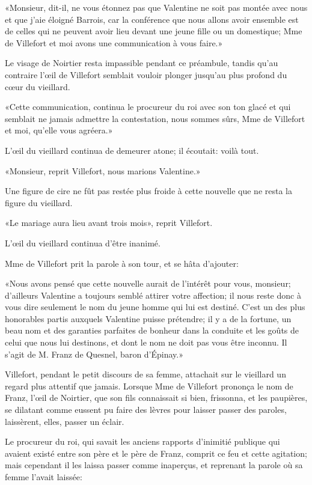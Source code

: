 «Monsieur, dit-il, ne vous étonnez pas que Valentine ne soit pas montée avec nous et que j'aie éloigné Barrois, car la conférence que nous allons avoir ensemble est de celles qui ne peuvent avoir lieu devant une jeune fille ou un domestique; Mme de Villefort et moi avons une communication à vous faire.» 

Le visage de Noirtier resta impassible pendant ce préambule, tandis qu'au contraire l'œil de Villefort semblait vouloir plonger jusqu'au plus profond du cœur du vieillard. 

«Cette communication, continua le procureur du roi avec son ton glacé et qui semblait ne jamais admettre la contestation, nous sommes sûrs, Mme de Villefort et moi, qu'elle vous agréera.» 

L'œil du vieillard continua de demeurer atone; il écoutait: voilà tout. 

«Monsieur, reprit Villefort, nous marions Valentine.» 

Une figure de cire ne fût pas restée plus froide à cette nouvelle que ne resta la figure du vieillard. 

«Le mariage aura lieu avant trois mois», reprit Villefort. 

L'œil du vieillard continua d'être inanimé. 

Mme de Villefort prit la parole à son tour, et se hâta d'ajouter: 

«Nous avons pensé que cette nouvelle aurait de l'intérêt pour vous, monsieur; d'ailleurs Valentine a toujours semblé attirer votre affection; il nous reste donc à vous dire seulement le nom du jeune homme qui lui est destiné. C'est un des plus honorables partis auxquels Valentine puisse prétendre; il y a de la fortune, un beau nom et des garanties parfaites de bonheur dans la conduite et les goûts de celui que nous lui destinons, et dont le nom ne doit pas vous être inconnu. Il s'agit de M. Franz de Quesnel, baron d'Épinay.» 

Villefort, pendant le petit discours de sa femme, attachait sur le vieillard un regard plus attentif que jamais. Lorsque Mme de Villefort prononça le nom de Franz, l'œil de Noirtier, que son fils connaissait si bien, frissonna, et les paupières, se dilatant comme eussent pu faire des lèvres pour laisser passer des paroles, laissèrent, elles, passer un éclair. 

Le procureur du roi, qui savait les anciens rapports d'inimitié publique qui avaient existé entre son père et le père de Franz, comprit ce feu et cette agitation; mais cependant il les laissa passer comme inaperçus, et reprenant la parole où sa femme l'avait laissée: 

